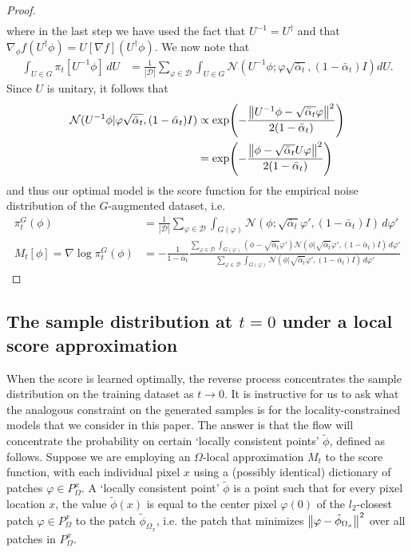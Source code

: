 \documentclass{article}
\theoremstyle{plain}
\theoremstyle{definition}
\theoremstyle{remark}
\begin{document}
\begin{proof}
\begin{align*}
\end{align*}
where in the last step we have used the fact that $U^{-1} = U^\dagger$ and that $\nabla_\phi f(U^\dagger \phi) = U [\nabla f](U^\dagger \phi) $. We now note that
\begin{align}
    \int_{U \in G} \pi_t[U^{-1} \phi]\,dU &= \frac{1}{|\mathcal{D}|} \sum_{\varphi \in \mathcal{D}} \int_{U \in G} \mathcal{N}(U^{-1} \phi; \varphi \sqrt{\bar{\alpha}_t}, (1 - \bar{\alpha}_t) I) dU.
\end{align}
Since $U$ is unitary, it follows that
\begin{align*}
    \mathcal{N}(U^{-1} \phi| \varphi\sqrt{\bar{\alpha}_t}, (1 - \bar{\alpha}_t)I) &\propto \exp(-\frac{\norm{U^{-1}\phi - \sqrt{\bar{\alpha}_t}\varphi}^2}{2(1-\bar{\alpha}_t)})\\
    &= \exp(-\frac{\norm{\phi - \sqrt{\bar{\alpha}_t} U \varphi}^2}{2(1 - \bar{\alpha}_t)})
\end{align*}
and thus our optimal model is the score function for the empirical noise distribution of the $G$-augmented dataset, i.e.
\begin{align}
    \pi_t^G(\phi) &= \frac{1}{|\mathcal{D}|} \sum_{\varphi \in \mathcal{D}} \int_{G(\varphi)}  \mathcal{N}(\phi; \sqrt{\bar{\alpha}_t}\varphi', (1 - \bar{\alpha}_t)I)\, d\varphi'\\
    M_t[\phi] = \nabla \log \pi_t^G(\phi) &= -\frac{1}{1 - \bar{\alpha}_t}\frac{\sum_{\varphi \in \mathcal{D}} \int_{G(\varphi)} (\phi - \sqrt{\bar{\alpha}_t} \varphi') \mathcal{N}(\phi|\sqrt{\bar{\alpha}_t} \varphi', (1 - \bar{\alpha}_t)I) \,d\varphi'}{\sum_{\varphi\in \mathcal{D}} \int_{G(\varphi)} \mathcal{N}(\phi|\sqrt{\bar{\alpha}_t} \varphi', (1 - \bar{\alpha}_t)I) \,d\varphi'}  
\end{align}


\end{proof}

\subsection{The sample distribution at $t = 0$ under a local score approximation}\label{app:sample_dist}

When the score is learned optimally, the reverse process concentrates the sample distribution on the training dataset as $t \to 0$. It is instructive for us to ask what the analogous constraint on the generated samples is for the locality-constrained models that we consider in this paper. The answer is that the flow will concentrate the probability on certain `locally consistent points' $\tilde{\phi}$, defined as follows. Suppose we are employing an $\Omega$-local approximation $M_t$ to the score function, with each individual pixel $x$ using a (possibly identical) dictionary of patches $\varphi \in P_\Omega^x$. A `locally consistent point' $\tilde{\phi}$ is a point such that for every pixel location $x$, the value $\tilde{\phi}(x)$ is equal to the center pixel $\varphi(0)$ of the $l_2$-closest patch $\varphi \in P_{\Omega}^x$ to the patch $\tilde{\phi}_{\Omega_x}$, i.e. the patch that minimizes $\norm{\varphi - \tilde{\phi}_{\Omega_x}}^2$ over all patches in $P_{\Omega}^x$.
\end{document}
